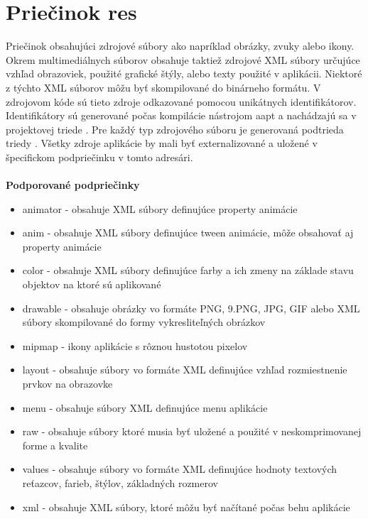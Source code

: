 \section{Priečinok res}
Priečinok obsahujúci zdrojové súbory ako napríklad obrázky, zvuky alebo ikony. Okrem multimediálnych súborov obsahuje taktiež zdrojové XML súbory určujúce vzhľad obrazoviek, použité grafické štýly, alebo texty použité v aplikácii. Niektoré z týchto XML súborov môžu byť skompilované do binárneho formátu. V zdrojovom kóde sú tieto zdroje odkazované pomocou unikátnych identifikátorov. Identifikátory sú generované počas kompilácie nástrojom aapt a nachádzajú sa v projektovej triede . Pre každý typ zdrojového súboru je generovaná podtrieda triedy . Všetky zdroje aplikácie by mali byť externalizované a uložené v špecifickom podpriečinku v tomto adresári. \\\\
\textbf{Podporované podpriečinky}
\begin{itemize}
\item animator - obsahuje XML súbory definujúce property animácie\cite{article-full}
\item anim - obsahuje XML súbory definujúce tween animácie, môže obsahovať aj property animácie
\item color - obsahuje XML súbory definujúce farby a ich zmeny na základe stavu objektov na ktoré sú aplikované
\item drawable - obsahuje obrázky vo formáte PNG, 9.PNG, JPG, GIF alebo XML súbory skompilované do formy vykresliteľných obrázkov
\item mipmap - ikony aplikácie s rôznou hustotou pixelov
\item layout - obsahuje súbory vo formáte XML definujúce vzhľad rozmiestnenie prvkov na obrazovke
\item menu - obsahuje súbory XML definujúce menu aplikácie
\item raw - obsahuje súbory ktoré musia byť uložené a použité v neskomprimovanej forme a kvalite
\item values - obsahuje súbory vo formáte XML definujúce hodnoty textových reťazcov, farieb, štýlov, základných rozmerov
\item xml - obsahuje XML súbory, ktoré môžu byť načítané počas behu aplikácie
\end{itemize}

